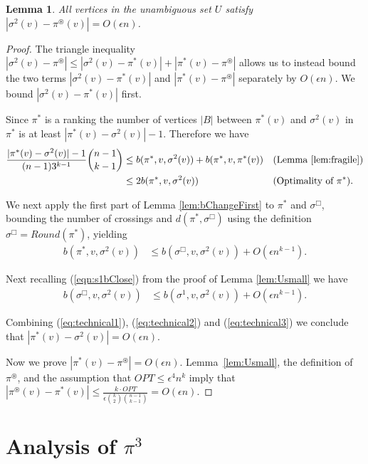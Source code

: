 \documentclass[dvips,11pt,letter]{article}
\newtheorem{lemma}[theorem]{Lemma}
\newcommand{\roundOpt}{\sigma^{\Box}}
\begin{document}
\begin{lemma}\label{lem:piTwo}
All vertices in the unambiguous set $U$ satisfy $|\sigma^2(v) - \pi^\circledast(v)|  = O(\epsilon n)$. 
\end{lemma}
\begin{proof}
The triangle inequality $|\sigma^2(v) - \pi^\circledast| \le |\sigma^2(v) - \pi^*(v)| + |\pi^*(v) -  \pi^\circledast|$ allows us to instead bound the two terms $|\sigma^2(v) - \pi^*(v)|$ and $|\pi^*(v) -  \pi^\circledast|$ separately by $O(\epsilon n)$. We bound $|\sigma^2(v) - \pi^*(v)|$ first.

Since $\pi^*$ is a ranking the number of vertices $|B|$ between $\pi^*(v)$ and $\sigma^2(v)$ in $\pi^*$ is at least $|\pi^*(v) - \sigma^2(v)| - 1$. Therefore we have
\begin{align}
\frac{|\pi^*(v) - \sigma^2(v)| - 1}{(n-1)3^{k-1}} \binom{n-1}{k-1} &\le b(\pi^*, v, \sigma^2(v)) + b(\pi^*, v, \pi^*(v)) && \text{(Lemma~\ref{lem:fragile})} \nonumber \\
& \le 2 b(\pi^*, v, \sigma^2(v)) && \text{(Optimality of $\pi^*$)} \label{eq:technical1}
.\end{align}

We next apply the first part of Lemma \ref{lem:bChangeFirst} to $\pi^*$ and $\roundOpt$, bounding the number of crossings and $d(\pi^*, \roundOpt)$ using the definition $\roundOpt = Round(\pi^*)$, yielding
\begin{align}
b(\pi^*, v, \sigma^2(v)) &\le b(\roundOpt, v, \sigma^2(v)) +O(\epsilon n^{k-1})
. \label{eq:technical2}\end{align}

Next recalling (\ref{eqn:s1bClose}) from the proof of Lemma \ref{lem:Usmall} we have
\begin{align}
b(\roundOpt, v, \sigma^2(v))&\le b(\sigma^1, v, \sigma^2(v)) + O(\epsilon n^{k-1})
. \label{eq:technical3} \end{align}

Combining (\ref{eq:technical1}), (\ref{eq:technical2}) and (\ref{eq:technical3}) we conclude that $|\pi^*(v) - \sigma^2(v)| = O(\epsilon n)$.

Now we prove $|\pi^*(v) -  \pi^\circledast|=O(\epsilon n)$.
Lemma~\ref{lem:Usmall}, the definition of $\pi^\circledast$, and the assumption that $OPT \le \epsilon^4 n^k$ imply that $|\pi^\circledast(v) - \pi^*(v)| \le \frac{k \cdot OPT}{\epsilon \binom{k}{2}\binom{n-1}{k-1}} = O(\epsilon n)$.
\end{proof}

\section{Analysis of $\pi^3$} \label{sec:piThree}
\end{document}
